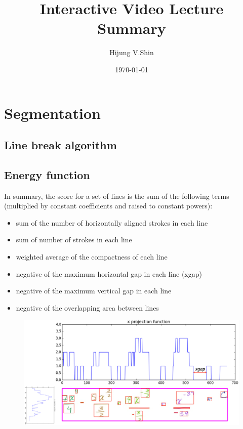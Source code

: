 \documentclass{article}
\begin{document}
\title{Interactive Video Lecture Summary}
\author{Hijung V.Shin}
\date{\today}
\maketitle



\section{Segmentation}

\subsection{Line break algorithm}
\subsection{Energy function}
In summary, the score for a set of lines is the sum of the following terms (multiplied by constant coefficients and raised to constant powers):
\begin{itemize}
\item{sum of the number of horizontally aligned strokes in each line}
\item{sum of number of strokes in each line}
\item{weighted average of the compactness of each line}
\item{negative of the maximum horizontal gap in each line (xgap)}
\item{negative of the maximum vertical gap in each line}
\item{negative of the overlapping area between lines}
\end{itemize}

\begin{figure}[!h]
\center\includegraphics[width=\textwidth]{figures/proj_function_example}

\end{figure}
\begin{figure}[!h]
\center
\end{figure}
\end{document}
